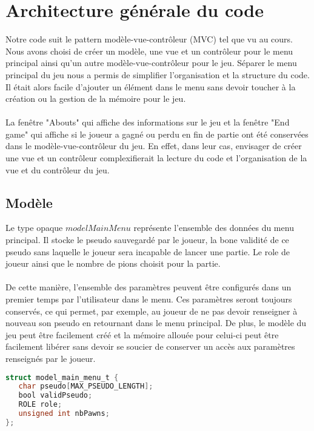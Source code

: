 
\section{Architecture générale du code}

Notre code suit le pattern modèle-vue-contrôleur (MVC) tel que vu au cours. Nous avons choisi de créer un modèle, une vue et un contrôleur pour le menu principal ainsi qu'un autre modèle-vue-contrôleur pour le jeu. Séparer le menu principal du jeu nous a permis de simplifier l'organisation et la structure du code. Il était alors facile d'ajouter un élément dans le menu sans devoir toucher à la création ou la gestion de la mémoire pour le jeu.
\\\\
La fenêtre "Abouts" qui affiche des informations sur le jeu et la fenêtre "End game" qui affiche si le joueur a gagné ou perdu en fin de partie ont été conservées dans le modèle-vue-contrôleur du jeu. En effet, dans leur cas, envisager de créer une vue et un contrôleur complexifierait la lecture du code et l'organisation de la vue et du contrôleur du jeu.

\subsection{Modèle}

Le type opaque $modelMainMenu$ représente l'ensemble des données du menu principal. Il stocke le pseudo sauvegardé par le joueur, la bone validité de ce pseudo sans laquelle le joueur sera incapable de lancer une partie. Le role de joueur ainsi que le nombre de pions choisit pour la partie.
\\\\
De cette manière, l'ensemble des paramètres peuvent être configurés dans un premier temps par l'utilisateur dans le menu. Ces paramètres seront toujours conservés, ce qui permet, par exemple, au joueur de ne pas devoir renseigner à nouveau son pseudo en retournant dans le menu principal. De plus, le modèle du jeu peut être facilement créé et la mémoire allouée pour celui-ci peut être facilement libérer sans devoir se soucier de conserver un accès aux paramètres renseignés par le joueur.
\begin{lstlisting}[language=C]
struct model_main_menu_t {
   char pseudo[MAX_PSEUDO_LENGTH];
   bool validPseudo;
   ROLE role;
   unsigned int nbPawns;
};
\end{lstlisting}

